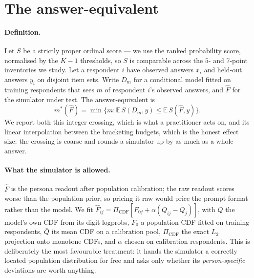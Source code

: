 
\section{The answer-equivalent}
\label{sec:equiv}

\paragraph{Definition.} Let $S$ be a strictly proper ordinal score --- we use the
ranked probability score, normalised by the $K{-}1$ thresholds, so $S$ is
comparable across the $5$- and $7$-point inventories we study. Let a respondent
$i$ have observed answers $x_i$ and held-out answers $y_i$ on disjoint item sets.
Write $D_m$ for a conditional model fitted on training respondents that sees $m$
of respondent $i$'s observed answers, and $\widehat{F}$ for the simulator under
test. The answer-equivalent is
\[
m^{*}(\widehat{F})=\min\{m: \mathbb{E}\,S(D_m, y)\le \mathbb{E}\,S(\widehat{F}, y)\}.
\]
We report both this integer crossing, which is what a practitioner acts on, and
its linear interpolation between the bracketing budgets, which is the honest
effect size: the crossing is coarse and rounds a simulator up by as much as a
whole answer.

\paragraph{What the simulator is allowed.} $\widehat{F}$ is the persona readout
after population calibration; the raw readout scores worse than the population
prior, so pricing it raw would price the prompt format rather than the model. We
fit $\widehat{F}_{ij}=\Pi_{\mathrm{CDF}}[F_{0j}+\alpha(Q_{ij}-\bar{Q}_j)]$, with
$Q$ the model's own CDF from its digit logprobs, $F_0$ a population CDF fitted on
training respondents, $\bar{Q}$ its mean CDF on a calibration pool,
$\Pi_{\mathrm{CDF}}$ the exact $L_2$ projection onto monotone CDFs, and $\alpha$
chosen on calibration respondents. This is deliberately the most favourable
treatment: it hands the simulator a correctly located population distribution for
free and asks only whether its \emph{person-specific} deviations are worth
anything.

